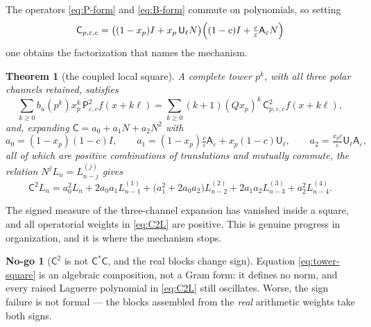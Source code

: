 \documentclass[11pt]{amsart}
\newtheorem{theorem}{Theorem}[section]
\theoremstyle{definition}
\theoremstyle{remark}
\theoremstyle{definition}
\newtheorem{nogo}{No-go}[section]
\newcommand{\eps}{\varepsilon}
\newcommand{\Pp}{\mathsf{P}}
\newcommand{\Cc}{\mathsf{C}}
\newcommand{\Uu}{\mathsf{U}}
\newcommand{\Aa}{\mathsf{A}}
\begin{document}
The operators \eqref{eq:P-form} and \eqref{eq:B-form} commute on polynomials, so setting
\begin{equation}\label{eq:C-op}
   \Cc_{p,\eps,c}
   =\bigl((1-x_p)I+x_p\,\Uu_\ell N\bigr)
    \Bigl((1-c)I+\tfrac{c}{\eps}\Aa_\eps N\Bigr)
\end{equation}
one obtains the factorization that names the mechanism.

\begin{theorem}[the coupled local square]\label{thm:tower-square}
A complete tower $p^k$, with all three polar channels retained,
satisfies
\begin{equation}\label{eq:tower-square}
   \sum_{k\ge0}b_u(p^k)x_p^k\,\Pp_{\eps,c}^2f(x+k\ell)
   =\sum_{k\ge0}(k+1)(Qx_p)^k\,\Cc_{p,\eps,c}^2f(x+k\ell),
\end{equation}
and, expanding $\Cc=a_0+a_1N+a_2N^2$ with
\[
   a_0=(1-x_p)(1-c)I,\qquad
   a_1=(1-x_p)\tfrac{c}{\eps}\Aa_\eps+x_p(1-c)\Uu_\ell,\qquad
   a_2=\tfrac{x_p c}{\eps}\Uu_\ell\Aa_\eps ,
\]
all of which are positive combinations of translations and mutually commute, the relation
$N^jL_n=L^{(j)}_{n-j}$ gives
\begin{equation}\label{eq:C2L}
   \Cc^2L_n=a_0^2L_n+2a_0a_1L^{(1)}_{n-1}+\bigl(a_1^2+2a_0a_2\bigr)L^{(2)}_{n-2}
   +2a_1a_2L^{(3)}_{n-3}+a_2^2L^{(4)}_{n-4}.
\end{equation}
\end{theorem}

The signed measure of the three-channel expansion has vanished inside a square, and all
operatorial weights in \eqref{eq:C2L} are positive. This is genuine progress in organization, and
it is where the mechanism stops.

\begin{nogo}[$\Cc^2$ is not $\Cc^{*}\Cc$, and the real blocks change sign]\label{ng:tower}
Equation \eqref{eq:tower-square} is an algebraic composition, not a Gram form: it defines no norm,
and every raised Laguerre polynomial in \eqref{eq:C2L} still oscillates. Worse, the sign failure is
not formal --- the blocks assembled from the \emph{real} arithmetic weights take both signs.
\end{nogo}
\end{document}
